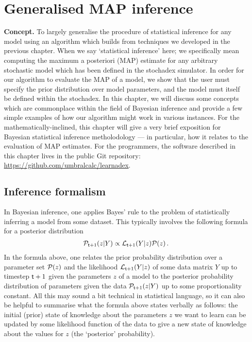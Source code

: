 \chapter{\sffamily Generalised MAP inference}

{\bfseries\sffamily Concept.} To largely generalise the procedure of statistical inference for any model using an algorithm which builds from techniques we developed in the previous chapter. When we say `statistical inference' here; we specifically mean computing the maximum a posteriori (MAP) estimate for any arbitrary stochastic model which has been defined in the stochadex simulator. In order for our algorithm to evaluate the MAP of a model, we show that the user must specify the prior distribution over model parameters, and the model must itself be defined within the stochadex. In this chapter, we will discuss some concepts which are commonplace within the field of Bayesian inference and provide a few simple examples of how our algorithm might work in various instances. For the mathematically-inclined, this chapter will give a very brief exposition for Bayesian statistical inference metholodology --- in particular, how it relates to the evaluation of MAP estimates. For the programmers, the software described in this chapter lives in the public Git repository: \href{https://github.com/umbralcalc/learnadex}{https://github.com/umbralcalc/learnadex}.


\section{\sffamily Inference formalism}

In Bayesian inference, one applies Bayes' rule to the problem of statistically inferring a model from some dataset. This typically involves the following formula for a posterior distribution
\begin{align}
{\cal P}_{{\sf t}+1}(z \vert Y) \propto {\cal L}_{{\sf t}+1}(Y\vert z){\cal P} (z) \label{eq:bayes-rule} \,.
\end{align}
In the formula above, one relates the prior probability distribution over a parameter set ${\cal P} (z)$ and the likelihood ${\cal L}_{{\sf t}+1}(Y\vert z)$  of some data matrix $Y$ up to timestep ${\sf t}+1$ given the parameters $z$ of a model to the posterior probability distribution of parameters given the data ${\cal P}_{{\sf t}+1}(z \vert Y)$ up to some proportionality constant. All this may sound a bit technical in statistical language, so it can also be helpful to summarise what the formula above states verbally as follows: the initial (prior) state of knowledge about the parameters $z$ we want to learn can be updated by some likelihood function of the data to give a new state of knowledge about the values for $z$ (the `posterior' probability). 


